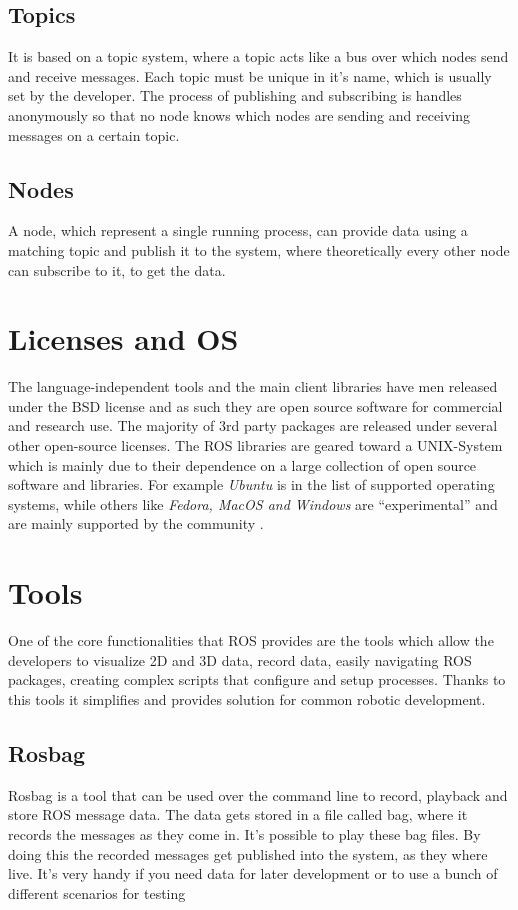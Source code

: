 \subsection{Topics}
It is based on a topic system, where a topic acts like a bus over which nodes send and receive messages. Each topic must be unique in it's name, which is usually set by the developer. The process of publishing and subscribing is handles anonymously so that no node knows which nodes are sending and receiving messages on a certain topic.

\subsection{Nodes}
A node, which represent a single running process, can provide data using a matching topic and publish it to the system, where theoretically every other node can subscribe to it, to get the data. 

\section{Licenses and OS}
The language-independent tools and the main client libraries have men released under the BSD license and as such they are open source software for commercial and research use. The majority of 3rd party packages are released under several other open-source licenses.\newline
The ROS libraries are geared toward a UNIX-System which is mainly due to their dependence on a large collection of open source software and libraries.
For example \textit{Ubuntu} is in the list of supported operating systems, while others like \textit{Fedora, MacOS and Windows} are \enquote{experimental} and are mainly supported by the community \cite{isrosforme}.

\section{Tools}
One of the core functionalities that ROS provides are the tools which allow the developers to visualize 2D and 3D data, record data, easily navigating ROS packages, creating complex scripts that configure and setup processes. Thanks to this tools it simplifies and provides solution for common robotic development.

\subsection{Rosbag}
Rosbag is a tool that can be used over the command line to record, playback and store ROS message data. The data gets stored in a file called bag, where it records the messages as they come in. It's possible to play these bag files. By doing this the recorded messages get published into the system, as they where live. It's very handy if you need data for later development or to use a bunch of different scenarios for testing

